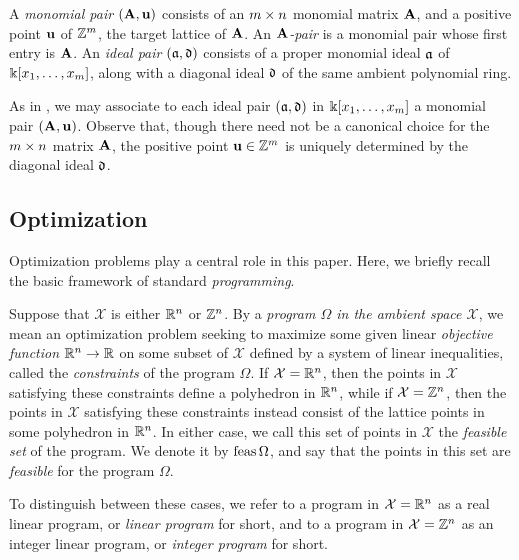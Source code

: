 \documentclass{amsart}
\begin{document}
\begin{definition}[Pairs]
\label{pairs: D}
   A \emph{monomial pair} $(\mathbf{A}, \mathbf{u})$ consists of an $m \times n$ monomial matrix $\mathbf{A}$, and a positive point $\mathbf{u}$ of $\mathbb{Z}^m$, the target lattice of $\mathbf{A}$.
    An \emph{$\mathbf{A}$-pair} is a monomial pair whose first entry is $\mathbf{A}$.
   An \emph{ideal pair} $(\mathfrak{a}, \mathfrak{d})$ consists of a proper monomial ideal $\mathfrak{a}$ of $\Bbbk[x_1, \ldots, x_{m}]$, along with a diagonal ideal $\mathfrak{d}$ of the same ambient polynomial ring.
\end{definition}

\begin{remark}
\label{associate of pairs: R}
 As in , we may associate to each ideal pair $(\mathfrak{a}, \mathfrak{d})$ in $\Bbbk[x_1, \ldots, x_{m}]$ a monomial pair $(\mathbf{A}, \mathbf{u})$.  Observe that, though there need not be a canonical choice for the $m \times n$ matrix $\mathbf{A}$, the positive point $\mathbf{u} \in \mathbb{Z}^m$ is uniquely determined by the diagonal ideal $\mathfrak{d}$.
\end{remark}

\subsection{Optimization} \label{optimization: S}  Optimization problems play a central role in this paper.  Here, we briefly recall the basic framework of standard \emph{programming}.

Suppose that $\mathcal{X}$ is either $\mathbb{R}^n$ or $\mathbb{Z}^n$.  By a \emph{program $\Omega$ in the ambient space $\mathcal{X}$}, we mean an optimization problem seeking to maximize some given linear \emph{objective function} $\mathbb{R}^n \to \mathbb{R}$ on some subset of $\mathcal{X}$ defined by a system of linear inequalities, called the \emph{constraints} of the program $\Omega$. If $\mathcal{X} = \mathbb{R}^n$, then the points in $\mathcal{X}$ satisfying these constraints define a polyhedron in $\mathbb{R}^n$, while if $\mathcal{X} = \mathbb{Z}^n$, then the points in $\mathcal{X}$ satisfying these constraints instead consist of the lattice points in some polyhedron in $\mathbb{R}^n$.  In either case, we call this set of points in $\mathcal{X}$ the \emph{feasible set} of the program.  We denote it by $\operatorname{feas} \Omega$, and say that the points in this set are \emph{feasible} for the program $\Omega$.

To distinguish between these cases, we refer to a program in $\mathcal{X} = \mathbb{R}^n$ as a {real linear program}, or \emph{linear program} for short, and to a program in $\mathcal{X}=\mathbb{Z}^n$ as an {integer linear program}, or \emph{integer program} for short.
\end{document}
